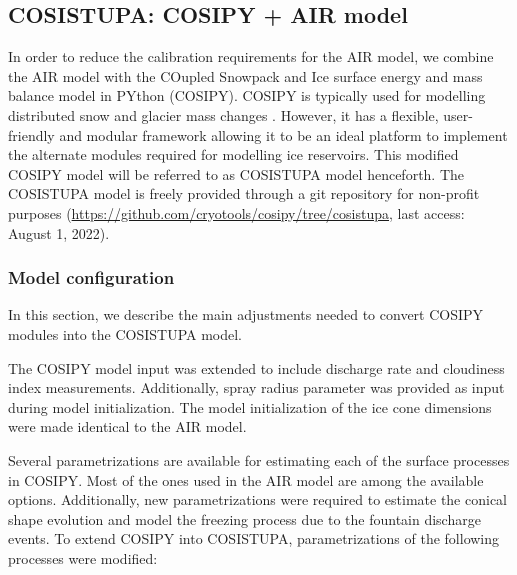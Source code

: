 \subsection{COSISTUPA: COSIPY + AIR model}
\label{sec:Cosistupa}

In order to reduce the calibration requirements for the AIR model, we combine the AIR model with the COupled
Snowpack and Ice surface energy and mass balance model in PYthon (COSIPY). COSIPY is typically used for
modelling distributed snow and glacier mass changes \citep{sauterCOSIPYV1Opensource2020}. However, it has a
flexible, user-friendly and modular framework allowing it to be an ideal platform to implement the alternate
modules required for modelling ice reservoirs. This modified COSIPY model will be referred to as COSISTUPA model
henceforth. The COSISTUPA model is freely provided through a git repository for non-profit purposes
(\url{https://github.com/cryotools/cosipy/tree/cosistupa}, last access: August 1, 2022). 


\subsubsection{Model configuration}

In this section, we describe the main adjustments needed to convert COSIPY modules into the COSISTUPA
model.

The COSIPY model input was extended to include discharge rate and cloudiness index measurements. Additionally,
spray radius parameter was provided as input during model initialization. The model initialization of the ice
cone dimensions were made identical to the AIR model.

Several parametrizations are available for estimating each of the surface processes in COSIPY. Most of the ones
used in the AIR model are among the available options. Additionally, new parametrizations were required to
estimate the conical shape evolution and model the freezing process due to the fountain discharge events. To
extend COSIPY into COSISTUPA, parametrizations of the following processes were modified:

